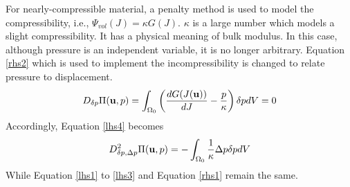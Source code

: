 For nearly-compressible material, a penalty method is used to model the compressibility, i.e., $\Psi_{vol}(J) = \kappa{G(J)}$. $\kappa$ is a large number which models a slight compressibility. It has a physical meaning of bulk modulus. In this case, although pressure is an independent variable, it is no longer arbitrary. Equation \ref{rhs2} which is used to implement the incompressibility is changed to relate pressure to displacement.
\begin{equation} \label{relation}
D_{\delta{p}}\Pi(\bold{u}, p) = \int_{\Omega_0}\left(  \frac{dG(J(\bold{u}))}{dJ} - \frac{p}{\kappa} \right)\delta{p}dV = 0
\end{equation}
Accordingly, Equation \ref{lhs4} becomes
\begin{equation} \label{lhs42}
D_{\delta{p}, \Delta{p}}^2 \Pi(\bold{u}, p) = - \int_{\Omega_0}\frac{1}{\kappa}\Delta{p}\delta{p}dV
\end{equation}
While Equation \ref{lhs1} to \ref{lhs3} and Equation \ref{rhs1} remain the same.
















